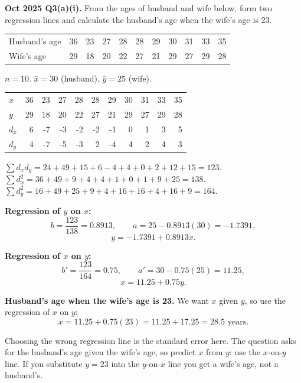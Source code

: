 \documentclass[11pt,a4paper]{article}
\begin{document}
\begin{pyqbox}
\textbf{Oct 2025 Q3(a)(i).} From the ages of husband and wife below, form two regression lines and calculate the husband's age when the wife's age is 23.

\begin{center}\small
\begin{tabular}{l|rrrrrrrrrr}
\toprule Husband's age & 36&23&27&28&28&29&30&31&33&35\\
Wife's age & 29&18&20&22&27&21&29&27&29&28\\\bottomrule
\end{tabular}
\end{center}
\end{pyqbox}

\begin{solbox}
$n=10$. $\bar x=30$ (husband), $\bar y=25$ (wife).

\begin{center}\small
\begin{tabular}{l|rrrrrrrrrr}
\toprule $x$ & 36&23&27&28&28&29&30&31&33&35\\
$y$ & 29&18&20&22&27&21&29&27&29&28\\
$d_x$ & 6&-7&-3&-2&-2&-1&0&1&3&5\\
$d_y$ & 4&-7&-5&-3&2&-4&4&2&4&3\\\bottomrule
\end{tabular}
\end{center}

$\sum d_xd_y=24+49+15+6-4+4+0+2+12+15=123$.
$\sum d_x^2=36+49+9+4+4+1+0+1+9+25=138$.
$\sum d_y^2=16+49+25+9+4+16+16+4+16+9=164$.

\textbf{Regression of $y$ on $x$:}
\[
b=\frac{123}{138}=0.8913,\qquad a=25-0.8913(30)=-1.7391,
\]
\[
\boxed{y=-1.7391+0.8913x}.
\]

\textbf{Regression of $x$ on $y$:}
\[
b'=\frac{123}{164}=0.75,\qquad a'=30-0.75(25)=11.25,
\]
\[
\boxed{x=11.25+0.75y}.
\]

\textbf{Husband's age when the wife's age is 23.} We want $x$ given $y$, so use the regression of $x$ on $y$:
\[
x=11.25+0.75(23)=11.25+17.25=\boxed{28.5\text{ years}}.
\]
\end{solbox}

\begin{dangerbox}
Choosing the wrong regression line is the standard error here. The question asks for the husband's age given the wife's age, so predict $x$ from $y$: use the $x$-on-$y$ line. If you substitute $y=23$ into the $y$-on-$x$ line you get a wife's age, not a husband's.
\end{dangerbox}
\end{document}

